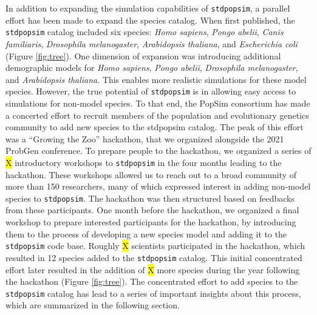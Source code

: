 \documentclass[hidelinks]{article}
\begin{document}
In addition to expanding the simulation capabilities of \texttt{stdpopsim}, a parallel effort has been made to expand the species catalog. When first
published, the \texttt{stdpopsim} catalog included six species: \emph{Homo sapiens}, \emph{Pongo abelii}, \emph{Canis familiaris}, \emph{Drosophila melanogaster}, \emph{Arabidopsis thaliana}, and \emph{Escherichia coli} (Figure \ref{fig:tree}).
One dimension of expansion was introducing additional demographic models for \emph{Homo sapiens}, \emph{Pongo abelii}, \emph{Drosophila melanogaster}, and \emph{Arabidopsis thaliana}. This enables more realistic simulations for these model species. 
However, the true potential of \texttt{stdpopsim} is in allowing easy access to simulations for non-model species. To that end, the PopSim consortium has made a concerted effort to recruit members of the population and evolutionary genetics community to add new species to the stdpopsim catalog. The peak of this effort was a ``Growing the Zoo'' hackathon, that we organized alongside the 2021 ProbGen conference. To prepare people to the hackathon, we organized a series of \colorbox{yellow}{X} introductory workshops to \texttt{stdpopsim} in the four months leading to the hackathon. These workshops allowed us to reach out to a broad community of more than 150 researchers, many of which expressed interest in adding non-model species to \texttt{stdpopsim}. The hackathon was then structured based on feedbacks from these participants. One month before the hackathon, we organized a final workshop to prepare interested participants for the hackathon, by introducing them to  the process of developing a new species model and adding it to the \texttt{stdpopsim}
code base. 
Roughly \colorbox{yellow}{X} scientists participated in the hackathon, which resulted in 12 species added to the \texttt{stdpopsim} catalog.
This initial concentrated effort later resulted in the addition of \colorbox{yellow}{X} more species during the year following the hackathon (Figure \ref{fig:tree}).
The concentrated effort to add species to the \texttt{stdpopsim} catalog has lead to a series of important insights about this process, which are summarized in the following section.
\end{document}
